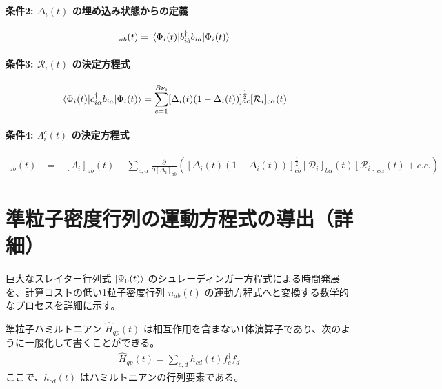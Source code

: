 \documentclass[a4paper,11pt]{ltjarticle}
\begin{document}
\paragraph{条件2: $\Delta_i(t)$ の埋め込み状態からの定義}
\begin{align}
    [\Delta_i]_{ab}(t) &= \mel{\Phi_i(t)}{b_{ib}^\dagger b_{ia}}{\Phi_i(t)} \label{eq:td_delta_phi}
\end{align}

\paragraph{条件3: $\mathcal{R}_i(t)$ の決定方程式}
\begin{align}
    \mel{\Phi_i(t)}{c_{i\alpha}^\dagger b_{ia}}{\Phi_i(t)} &= \sum_{c=1}^{B\nu_i} [\Delta_i(t)(1-\Delta_i(t))]^{\frac{1}{2}}_{ac} [\mathcal{R}_i]_{c\alpha}(t) \label{eq:td_R_gen}
\end{align}

\paragraph{条件4: $\Lambda_i^c(t)$ の決定方程式}
\begin{align}
    [\Lambda_i^c]_{ab}(t) &= - [\Lambda_i]_{ab}(t) - \sum_{c, \alpha} \frac{\partial}{\partial [\Delta_i]_{ab}} \left( [\Delta_i(t)(1-\Delta_i(t))]^{\frac{1}{2}}_{cb} [\mathcal{D}_i]_{b\alpha}(t) [\mathcal{R}_i]_{c\alpha}(t) + c.c. \right) \label{eq:td_lambda_gen}
\end{align}

\section{準粒子密度行列の運動方程式の導出（詳細）}
巨大なスレイター行列式 $\ket{\Psi_0(t)}$ のシュレーディンガー方程式による時間発展を、計算コストの低い1粒子密度行列 $n_{ab}(t)$ の運動方程式へと変換する数学的なプロセスを詳細に示す。

準粒子ハミルトニアン $\hat{H}_{qp}(t)$ は相互作用を含まない1体演算子であり、次のように一般化して書くことができる。
\begin{align}
    \hat{H}_{qp}(t) = \sum_{c,d} h_{cd}(t) f_c^\dagger f_d
\end{align}
ここで、$h_{cd}(t)$ はハミルトニアンの行列要素である。
\end{document}
